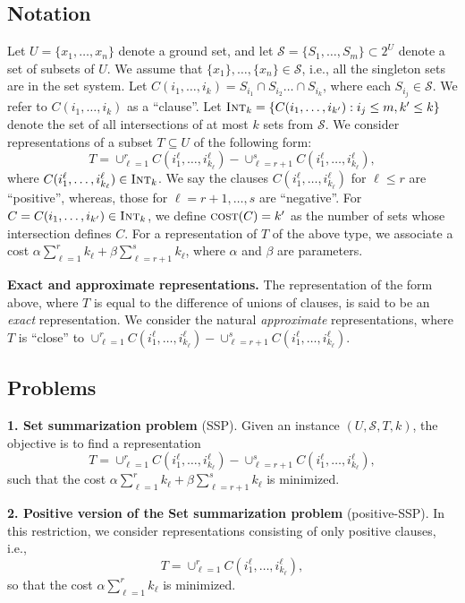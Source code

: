 \documentclass[twoside, leqno, twocolumn]{article}
\newcommand{\intS}{\textsc{Int}}
\newcommand{\cost}{\textsc{cost}}
\begin{document}
\subsection{Notation}
Let $U=\{x_1,\ldots,x_n\}$ denote a ground set, and let 
$\mathcal{S}=\{S_1,\ldots,S_m\}\subset 2^U$ denote a set of subsets of $U$. 
We assume that $\{x_1\},\ldots,\{x_n\}\in\mathcal{S}$, i.e., all the singleton
sets are in the set system.
Let $C(i_1,\ldots,i_k) = S_{i_1}\cap S_{i_2}\ldots\cap S_{i_k}$, where
each $S_{i_j}\in \mathcal{S}$. We refer to $C(i_1,\ldots,i_k)$ as a ``clause''.
Let $\intS_k=\{C(i_1,\ldots,i_{k'}): i_j\leq m, k'\leq k\}$
denote the set of all intersections of at most $k$ sets from $\mathcal{S}$.
We consider representations of a subset $T\subseteq U$ of the following form:
\[
T = \cup_{\ell=1}^r C(i^{\ell}_1,\ldots,i^{\ell}_{k_{\ell}}) - 
 \cup_{\ell=r+1}^s C(i^{\ell}_1,\ldots,i^{\ell}_{k_{\ell}}),
\]
where $C(i^{\ell}_1,\ldots,i^{\ell}_{k_{\ell}})\in \intS_k$.
We say the clauses $C(i^{\ell}_1,\ldots,i^{\ell}_{k_{\ell}})$ for $\ell\leq r$
are ``positive'', whereas, those for $\ell=r+1,\ldots,s$ are ``negative''.
For $C=C(i_1,\ldots,i_{k'})\in \intS_k$, we define $\cost(C)=k'$ as the
number of sets whose intersection defines $C$.
For a representation of $T$ of the above type, we associate
a cost $\alpha\sum_{\ell=1}^r k_{\ell} + \beta \sum_{\ell=r+1}^s k_{\ell}$,
where $\alpha$ and $\beta$ are parameters. 

\noindent
\textbf{Exact and approximate representations.}
The representation of the form above, where $T$ is equal to the difference of
unions of clauses, is said to be an \emph{exact} representation.
We consider the natural \emph{approximate} representations, where 
$T$ is ``close'' to $\cup_{\ell=1}^r C(i^{\ell}_1,\ldots,i^{\ell}_{k_{\ell}}) -
 \cup_{\ell=r+1}^s C(i^{\ell}_1,\ldots,i^{\ell}_{k_{\ell}})$.
\smallskip

\subsection{Problems}
\noindent
\textbf{1. Set summarization problem} (SSP). Given an instance $(U, \mathcal{S}, T, k)$,
the objective is to find a representation
\[
T = \cup_{\ell=1}^r C(i^{\ell}_1,\ldots,i^{\ell}_{k_{\ell}}) - 
 \cup_{\ell=r+1}^s C(i^{\ell}_1,\ldots,i^{\ell}_{k_{\ell}}),
\]
such that the cost 
$\alpha\sum_{\ell=1}^r k_{\ell} + \beta \sum_{\ell=r+1}^s k_{\ell}$ is minimized.

\noindent
\textbf{2. Positive version of the Set summarization problem} (positive-SSP). 
In this restriction, we consider representations consisting of only positive clauses, i.e.,
\[
T = \cup_{\ell=1}^r C(i^{\ell}_1,\ldots,i^{\ell}_{k_{\ell}}),
\]
so that the cost $\alpha\sum_{\ell=1}^r k_{\ell}$ is minimized.
\end{document}
